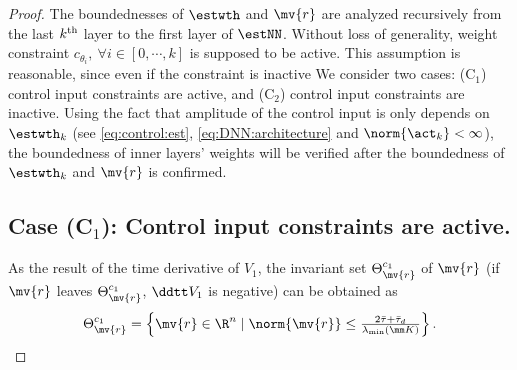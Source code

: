 \documentclass[lettersize,journal]{IEEEtran}
\newcommand*{\fe}{\mv{r}}
\begin{document}
\begin{proof}

The boundednesses of $\estwth$ and $\fe$ are analyzed recursively from the last $k\textsuperscript{th}$ layer to the first layer of $\estNN$. 
Without loss of generality, weight constraint $c_{\theta_i},\ \forall i\in[0,\cdots,k]$ is supposed to be active.
This assumption is reasonable, since even if the constraint is inactive 
We consider two cases: (C$_1$) control input constraints are active, and (C$_2$) control input constraints are inactive.
Using the fact that amplitude of the control input is only depends on $\estwth_k$ (\ie see \eqref{eq:control:est}, \eqref{eq:DNN:architecture} and $\norm{\act_k}<\infty$), the boundedness of inner layers' weights will be verified after the boundedness of $\estwth_k$ and $\fe$ is confirmed. 

\subsection*{Case (C$_1$): Control input constraints are active.}

As the result of the time derivative of $V_1$, the invariant set $\Theta_{\fe}^{c_1}$ of $\fe$ (\ie if $\fe$ leaves $\Theta_{\fe}^{c_1}$, $\ddtt V_1$ is negative) can be obtained as 
\begin{equation}
    \Theta_{\fe}^{c_1} 
    = 
    \left\{ 
        \fe \in \R^n 
        \mid 
        \norm{\fe} 
        \le 
        \tfrac{2\bar\tau+\bar\tau_d}{\lambda_{\text{min}}(\mm K)}
    \right\}
    .
    \label{eq:invariant:c1:fe}
\end{equation}


\end{proof}
\end{document}
